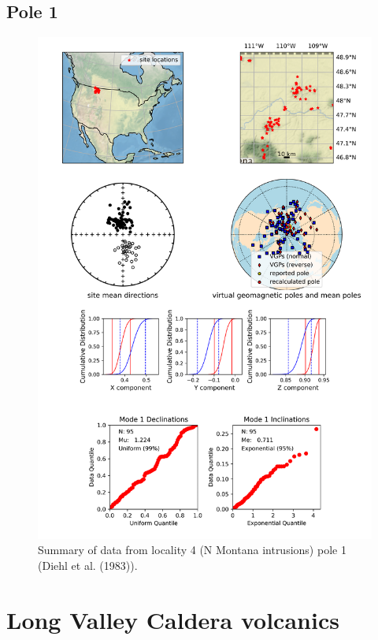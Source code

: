 \documentclass{article}
\begin{document}
\subsection{Pole 1}


\begin{figure}[H]
\centering
\includegraphics[width=5 in]{./4/1/pole_summary.png}
\caption{Summary of data from locality 4 (N Montana intrusions) pole 1 (Diehl et al. (1983)).}
\end{figure}

\section{Long Valley Caldera volcanics}
\end{document}
